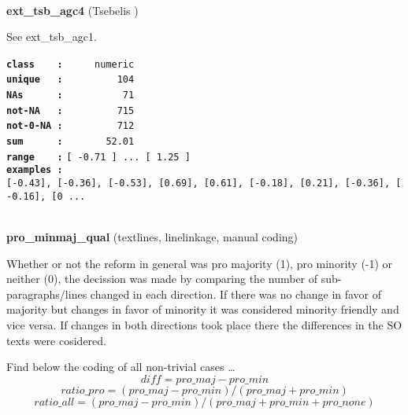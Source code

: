 \documentclass[]{article}
\begin{document}
~

\textbf{ext\_tsb\_agc4} (Tsebelis )

See ext\_tsb\_agc1.

\textbf{\texttt{class\ \ \ \ :}} \texttt{~~~~~numeric}\\
\textbf{\texttt{unique\ \ \ :}} \texttt{~~~~~~~~~104}\\
\textbf{\texttt{NAs\ \ \ \ \ \ :}} \texttt{~~~~~~~~~~71}\\
\textbf{\texttt{not-NA\ \ \ :}} \texttt{~~~~~~~~~715}\\
\textbf{\texttt{not-0-NA\ :}} \texttt{~~~~~~~~~712}\\
\textbf{\texttt{sum\ \ \ \ \ \ :}} \texttt{~~~~~~~52.01}\\
\textbf{\texttt{range\ \ \ \ :}}
\texttt{{[}\ -0.71\ {]}\ ...\ {[}\ 1.25\ {]}}\\
\textbf{\texttt{examples\ :}}
\texttt{{[}-0.43{]},\ {[}-0.36{]},\ {[}-0.53{]},\ {[}0.69{]},\ {[}0.61{]},\ {[}-0.18{]},\ {[}0.21{]},\ {[}-0.36{]},\ {[}-0.16{]},\ {[}0\ ...}\\

~

\textbf{pro\_minmaj\_qual} (textlines, linelinkage, manual coding)

Whether or not the reform in general was pro majority (1), pro minority
(-1) or neither (0), the decission was made by comparing the number of
sub-paragraphs/lines changed in each direction. If there was no change
in favor of majority but changes in favor of minority it was considered
minority friendly and vice versa. If changes in both directions took
place there the differences in the SO texts were cosidered.

Find below the coding of all non-trivial cases \ldots{}
\[ diff = pro\_maj - pro\_min \]
\[ ratio\_pro = (pro\_maj - pro\_min) / (pro\_maj + pro\_min) \]
\[ ratio\_all = (pro\_maj - pro\_min) / (pro\_maj + pro\_min + pro\_none) \]
\end{document}
